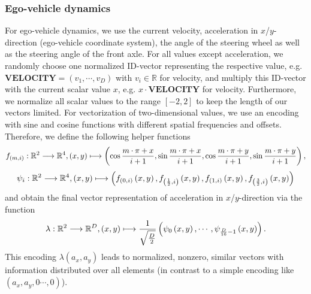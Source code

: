 \subsubsection{Ego-vehicle dynamics}
For ego-vehicle dynamics, we use the current velocity, acceleration in $x$/$y$-direction (ego-vehicle coordinate system), the angle of the steering wheel as well as the steering angle of the front axle.
For all values except acceleration, we randomly choose one normalized ID-vector representing the respective value, e.g. $\mathbf{VELOCITY}=\left(v_1, \cdots, v_D\right)$ with $v_i \in \mathbb{R}$ for velocity, and multiply this ID-vector with the current scalar value $x$, e.g. $x \cdot \mathbf{VELOCITY}$ for velocity.
Furthermore, we normalize all scalar values to the range $\left[-2,2\right]$ to keep the length of our vectors limited.
For vectorization of two-dimensional values, we use an encoding with sine and cosine functions with different spatial frequencies and offsets.
Therefore, we define the following helper functions
\[ f_{\left(m,i\right)}: \mathbb{R}^2 \longrightarrow \mathbb{R}^4, \left(x,y\right) \longmapsto \left(\cos\frac{m\cdot \pi + x}{i + 1}, \sin\frac{m\cdot \pi + x}{i + 1}, \cos\frac{m\cdot \pi + y}{i + 1}, \sin\frac{m\cdot \pi + y}{i + 1}\right),
\]
\[
\psi_i: \mathbb{R}^2 \longrightarrow \mathbb{R}^4, \left(x,y\right) \longmapsto \left(f_{\left(0,i\right)}\left(x,y\right), f_{\left(\frac{1}{2},i\right)}\left(x,y\right), f_{\left(1,i\right)}\left(x,y\right), f_{\left(\frac{3}{2},i\right)}\left(x,y\right)\right)
\]
and obtain the final vector representation of acceleration in $x$/$y$-direction via the function
\[
\lambda: \mathbb{R}^2 \longrightarrow \mathbb{R}^D, \left(x,y\right) \longmapsto \frac{1}{\sqrt{\frac{D}{2}}}\left(\psi_0\left(x,y\right), \cdots, \psi_{\frac{D}{16}-1}\left(x,y\right)\right).
\]
This encoding $\lambda\left(a_x, a_y\right)$ leads to normalized, nonzero, similar vectors with information distributed over all elements (in contrast to a simple encoding like $\left(a_x, a_y, 0 \cdots, 0\right)$).\\
